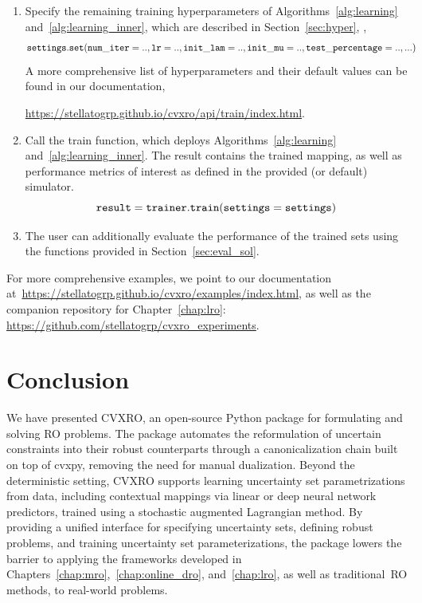 {\begin{singlespace}
\begin{enumerate}
    \begin{align*}
&\tt{settings.avg\_scale = 0.5}\\
&\tt{settings.cvar\_scale = 0.5}\\
&\tt{settings.eta = 0.05}
  \end{align*}
\item Specify the remaining training hyperparameters of Algorithms~\ref{alg:learning} and~\ref{alg:learning_inner}, which are described in Section~\ref{sec:hyper}, \eg,
    \begin{align*}
&\tt{settings.set(num\_iter = .., lr = .., init\_lam = .., init\_mu = .., test\_percentage=.., ...)}
  \end{align*}
  A more comprehensive list of hyperparameters and their default values can be found in our documentation,
  \begin{center}
    \url{https://stellatogrp.github.io/cvxro/api/train/index.html}.
  \end{center}
\item Call the train function, which deploys Algorithms~\ref{alg:learning} and~\ref{alg:learning_inner}. The result contains the trained mapping, as well as performance metrics of interest as defined in the provided (or default) simulator. 
$$\tt{result = trainer.train(settings=settings)} $$
\item The user can additionally evaluate the performance of the trained sets using the functions provided in Section~\ref{sec:eval_sol}.
\end{enumerate}
\end{singlespace}}

For more comprehensive examples, we point to our documentation at~\url{https://stellatogrp.github.io/cvxro/examples/index.html}, as well as the companion repository for Chapter~\ref{chap:lro}: \url{https://github.com/stellatogrp/cvxro_experiments}.

\section{Conclusion}
\label{sec:cvxro_conclusion}
We have presented \gls{CVXRO}, an open-source Python package for formulating and solving \gls{RO} problems.
The package automates the reformulation of uncertain constraints into their robust counterparts through a canonicalization chain built on top of cvxpy, removing the need for manual dualization.
Beyond the deterministic setting, \gls{CVXRO} supports learning uncertainty set parametrizations from data, including contextual mappings via linear or deep neural network predictors, trained using a stochastic augmented Lagrangian method.
By providing a unified interface for specifying uncertainty sets, defining robust problems, and training uncertainty set parameterizations, the package lowers the barrier to applying the frameworks developed in Chapters~\ref{chap:mro},~\ref{chap:online_dro}, and~\ref{chap:lro}, as well as traditional~\gls{RO} methods, to real-world problems.

